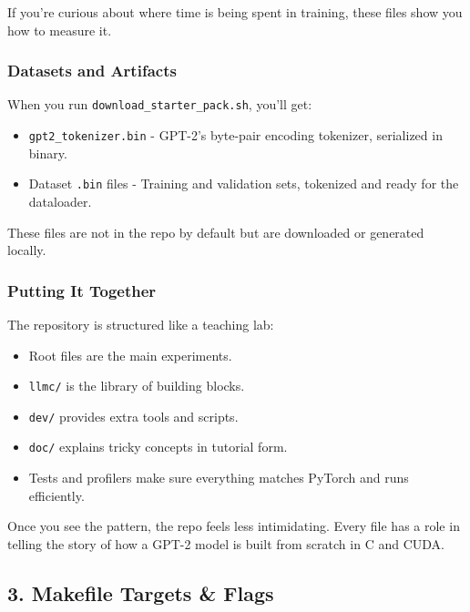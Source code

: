 \documentclass[
  letterpaper,
  DIV=11,
  numbers=noendperiod]{scrreprt}
\providecommand{\tightlist}{%
  \setlength{\itemsep}{0pt}\setlength{\parskip}{0pt}}
\begin{document}
If you're curious about where time is being spent in training, these
files show you how to measure it.

\subsubsection{Datasets and Artifacts}\label{datasets-and-artifacts}

When you run \texttt{download\_starter\_pack.sh}, you'll get:

\begin{itemize}
\tightlist
\item
  \texttt{gpt2\_tokenizer.bin} - GPT-2's byte-pair encoding tokenizer,
  serialized in binary.
\item
  Dataset \texttt{.bin} files - Training and validation sets, tokenized
  and ready for the dataloader.
\end{itemize}

These files are not in the repo by default but are downloaded or
generated locally.

\subsubsection{Putting It Together}\label{putting-it-together}

The repository is structured like a teaching lab:

\begin{itemize}
\tightlist
\item
  Root files are the main experiments.
\item
  \texttt{llmc/} is the library of building blocks.
\item
  \texttt{dev/} provides extra tools and scripts.
\item
  \texttt{doc/} explains tricky concepts in tutorial form.
\item
  Tests and profilers make sure everything matches PyTorch and runs
  efficiently.
\end{itemize}

Once you see the pattern, the repo feels less intimidating. Every file
has a role in telling the story of how a GPT-2 model is built from
scratch in C and CUDA.

\subsection{3. Makefile Targets \& Flags}\label{makefile-targets-flags}
\end{document}
